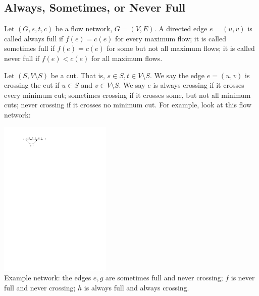 \documentclass[12pt,a4]{article}
\begin{document}
\subsection{Always, Sometimes, or Never Full}


Let $(G,s,t,c)$ be a flow network, $G = (V,E)$. A directed edge $e=(u,v)$ is called always full if $f(e) = c(e)$ for every maximum flow; it is called sometimes full if $f(e) = c(e)$ for some but not all maximum flows; it is called never full if $f(e) < c(e)$ for all maximum flows.

Let $(S, V\setminus S)$ be a cut. That is, $s \in S, t \in V \setminus S$. We say the edge $e = (u,v)$ is crossing the cut if $u \in S$ and $v \in V \setminus S$. We say $e$ is always crossing if it crosses every minimum cut; sometimes crossing if it crosses some, but not all minimum cuts; never crossing if it crosses no minimum cut. For example, look at this flow network:
\begin{center}
\includegraphics[width=0.4\textwidth]{figures/flow-network-always-sometimes-never.pdf}\\
\small Example network: the edges $e,g$ are sometimes full and never crossing; $f$ is never full and never crossing; $h$ is always full and always crossing.
\end{center}
\end{document}

